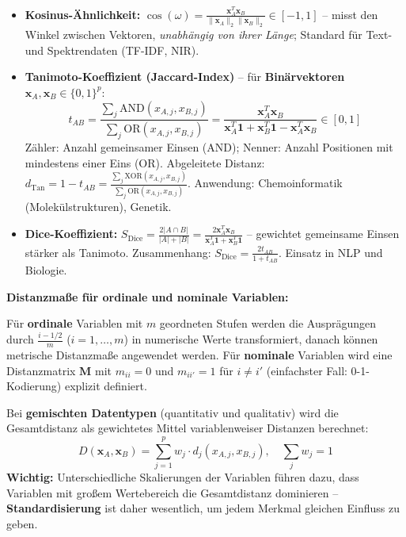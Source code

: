 \begin{itemize}[leftmargin=1.5em]
    \item \textbf{Kosinus-Ähnlichkeit:}
    $\cos(\omega) = \frac{\mathbf{x}_A^T\mathbf{x}_B}{\|\mathbf{x}_A\|_2\|\mathbf{x}_B\|_2} \in [-1,1]$
    -- misst den Winkel zwischen Vektoren, \emph{unabhängig von ihrer Länge}; Standard für Text- und Spektrendaten (TF-IDF, NIR).

    \item \textbf{Tanimoto-Koeffizient (Jaccard-Index)} -- für \textbf{Binärvektoren} $\mathbf{x}_A, \mathbf{x}_B \in \{0,1\}^p$:
    $$t_{AB} = \frac{\sum_j \text{AND}(x_{A,j}, x_{B,j})}{\sum_j \text{OR}(x_{A,j}, x_{B,j})} = \frac{\mathbf{x}_A^T\mathbf{x}_B}{\mathbf{x}_A^T\mathbf{1} + \mathbf{x}_B^T\mathbf{1} - \mathbf{x}_A^T\mathbf{x}_B} \in [0,1]$$
    Zähler: Anzahl gemeinsamer Einsen (AND); Nenner: Anzahl Positionen mit mindestens einer Eins (OR). Abgeleitete Distanz: $d_{\text{Tan}} = 1 - t_{AB} = \frac{\sum_j \text{XOR}(x_{A,j},x_{B,j})}{\sum_j \text{OR}(x_{A,j},x_{B,j})}$. Anwendung: Chemoinformatik (Molekülstrukturen), Genetik.

    \item \textbf{Dice-Koeffizient:}
    $S_{\text{Dice}} = \frac{2|A \cap B|}{|A| + |B|} = \frac{2\mathbf{x}_A^T\mathbf{x}_B}{\mathbf{x}_A^T\mathbf{1} + \mathbf{x}_B^T\mathbf{1}}$
    -- gewichtet gemeinsame Einsen stärker als Tanimoto. Zusammenhang: $S_{\text{Dice}} = \frac{2t_{AB}}{1+t_{AB}}$. Einsatz in NLP und Biologie.
\end{itemize}

\noindent\textbf{Distanzmaße für ordinale und nominale Variablen:}

Für \textbf{ordinale} Variablen mit $m$ geordneten Stufen werden die Ausprägungen durch $\frac{i-1/2}{m}$ ($i=1,\ldots,m$) in numerische Werte transformiert, danach können metrische Distanzmaße angewendet werden. Für \textbf{nominale} Variablen wird eine Distanzmatrix $\mathbf{M}$ mit $m_{ii}=0$ und $m_{ii'}=1$ für $i\neq i'$ (einfachster Fall: 0-1-Kodierung) explizit definiert.

Bei \textbf{gemischten Datentypen} (quantitativ und qualitativ) wird die Gesamtdistanz als gewichtetes Mittel variablenweiser Distanzen berechnet:
$$D(\mathbf{x}_A, \mathbf{x}_B) = \sum_{j=1}^{p} w_j \cdot d_j(x_{A,j}, x_{B,j}), \quad \sum_j w_j = 1$$
\textbf{Wichtig:} Unterschiedliche Skalierungen der Variablen führen dazu, dass Variablen mit großem Wertebereich die Gesamtdistanz dominieren -- \textbf{Standardisierung} ist daher wesentlich, um jedem Merkmal gleichen Einfluss zu geben.

